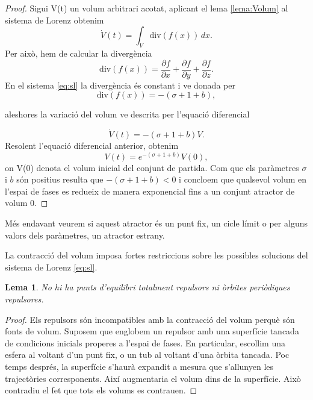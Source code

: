 \documentclass[11pt,a4paper,openright,oneside]{article}
\numberwithin{equation}{section}
\newtheorem{lema}[teo]{Lema}
\theoremstyle{definition}
\begin{document}
\begin{proof}
    Sigui V(t) un volum arbitrari acotat, aplicant el lema \eqref{lema:Volum} al sistema de Lorenz obtenim
    \begin{equation*}
        \dot{V}(t)=\int_{V} \text{div}(f(x))\,dx.
    \end{equation*}
    Per això, hem de calcular la divergència
    \begin{equation*}
        \text{div}(f(x))=\frac{\partial f}{\partial x}+\frac{\partial f}{\partial y}+\frac{\partial f}{\partial z}.
    \end{equation*}
    En el sistema \eqref{eq:sl} la divergència és constant i ve donada per
    \begin{equation*}
        \text{div}\left(f(x)\right)=-(\sigma+1+b),
    \end{equation*}
    
    aleshores la variació del volum ve descrita per l'equació diferencial
    
    \begin{equation*}
        \dot{V}(t)=-(\sigma+1+b)V.
    \end{equation*}
    Resolent l'equació diferencial anterior, obtenim 
    \begin{equation*}
        V(t)=e^{-(\sigma+1+b)}V(0),
    \end{equation*}
    on V(0) denota el volum inicial del conjunt de partida. Com que els paràmetres $\sigma$ i $b$ són positius resulta que $-(\sigma+1+b)<0$ i concloem que qualsevol volum en l'espai de fases es redueix de manera exponencial fins a un conjunt atractor de volum $0$.
\end{proof}

Més endavant veurem si aquest atractor és un punt fix, un cicle límit o per alguns valors dels paràmetres, un atractor estrany. 

La contracció del volum imposa fortes restriccions sobre les possibles solucions del sistema de Lorenz \eqref{eq:sl}.

\begin{lema}
    No hi ha punts d'equilibri totalment repulsors ni òrbites periòdiques repulsores.
\end{lema}

\begin{proof}
    Els repulsors són incompatibles amb la contracció del volum perquè són fonts de volum. Suposem que englobem un repulsor amb una superfície tancada de condicions inicials properes a l'espai de fases. En particular, escollim una esfera al voltant d'un punt fix, o un tub al voltant d'una òrbita tancada. Poc temps després, la superfície s'haurà expandit a mesura que s'allunyen les trajectòries corresponents. Així augmentaria el volum dins de la superfície. Això contradiu el fet que tots els volums es contrauen.
\end{proof}
\end{document}

